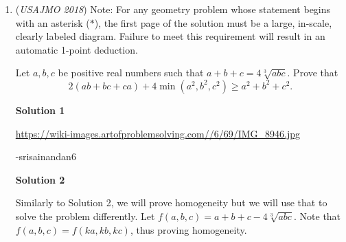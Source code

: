 \begin{enumerate}
 



\textbf{Solution 5}

Let $a_n$ be the number of $n$-digit numbers that satisfy the condition that most-left digit different than $0$. Let $b_n$ be the number of $n$-digit numbers that satisfy the condition that most-left digit is $0$. We can write that
 \[\left\{ \begin{split}  a_n + b_n & = 4\cdot 9^{n-1} \\  b_n & = a_{n-1} \end{split} \right.\]and so we find that
 \[a_n + a_{n-1}  = 4\cdot 9^{n-1} \tag{1}\]$x+1$ is the characteristic polynomial of the homogeneous recurrence relation $a_n + a_{n-1}  = 0$. Then $x=-1$ is a root. Also, by the non-homogeneous part of $4\cdot 9^{n-1}$, we understand that $x=9$ is another root of the recurrence relation $(1)$ with the complementary solution idea. Therefore, $(a_n)$ sequence in the form 
 \[a_n =C_19^n + C_2(-1)^n .\]We can calculate that $C_1 = \dfrac{2}{5}, C_2 = - \dfrac{2}{5}$ with using $a_1=4, a_2=32$. Thus we get:
 \[a_n = \dfrac{2}{5}\left(9^{n} - (-1)^{n} \right)\]

 Lokman GÖKÇE

 


 


 


	\item (\textit{USAJMO 2018}) Note: For any geometry problem whose statement begins with an asterisk ($*$), the first page of the solution must be a large, in-scale, clearly labeled diagram. Failure to meet this requirement will result in an automatic 1-point deduction. 


 Let $a,b,c$ be positive real numbers such that $a+b+c=4\sqrt[3]{abc}$. Prove that 
 \[2(ab+bc+ca)+4\min(a^2,b^2,c^2)\ge a^2+b^2+c^2.\]




\textbf{Solution 1}

\href{https://wiki-images.artofproblemsolving.com//6/69/IMG\_8946.jpg}{https://wiki-images.artofproblemsolving.com//6/69/IMG\_8946.jpg}

 -srisainandan6

 



\textbf{Solution 2}

Similarly to Solution 2, we will prove homogeneity but we will use that to solve the problem differently. Let $f(a,b,c)=a+b+c-4\sqrt[3]{abc}$. Note that $f(a,b,c)=f(ka,kb,kc)$, thus proving homogeneity. 


\end{enumerate}
